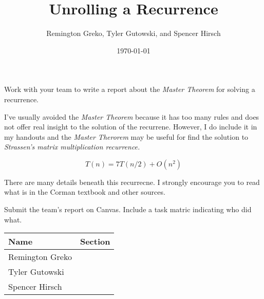 \documentclass{article}
\begin{document}
\title{\textbf{Unrolling a Recurrence}}
\author{Remington Greko, Tyler Gutowski, and Spencer Hirsch}
\date{\today}

\maketitle

\noindent Work with your team to write a report about the \textit{Master Theorem} for solving
a recurrence.

I've usually avoided the \textit{Master Theorem} because it has too many rules and does not
offer real insight to the solution of the recurrene. However, I do include it in my handouts
and the \textit{Master Therorem} may be useful for find the solution to \textit{Strassen's
matrix multiplication recurrence.}

\[T(n) = 7T(n/2) + O(n^2)\]

\noindent There are many details beneath this recurrecne. I strongly encourage you to read
what is in the Corman textbook and other sources.

Submit the team's report on Canvas. Include a task matric indicating who did what.

\pagebreak

\begin{center}
        \begin{tabular}{|p{3cm}|p{6cm}|}
            \hline
            \textbf{Name} & \textbf{Section} \\
            \hline
            Remington Greko & \\
            \hline
            Tyler Gutowski & \\
            \hline
            Spencer Hirsch & \\
            \hline
        \end{tabular}
    \end{center}
\end{document}
